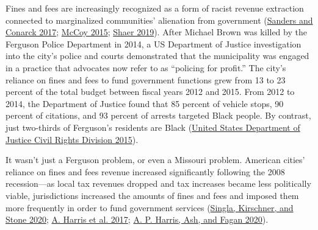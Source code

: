 \documentclass[
  12pt,
]{article}
\begin{document}
Fines and fees are increasingly recognized as a form of racist revenue extraction connected to marginalized communities' alienation from government (\protect\hyperlink{ref-Sanders2017}{Sanders and Conarck 2017}; \protect\hyperlink{ref-McCoy2015}{McCoy 2015}; \protect\hyperlink{ref-Shaer2019}{Shaer 2019}). After Michael Brown was killed by the Ferguson Police Department in 2014, a US Department of Justice investigation into the city's police and courts demonstrated that the municipality was engaged in a practice that advocates now refer to as ``policing for profit.'' The city's reliance on fines and fees to fund government functions grew from 13 to 23 percent of the total budget between fiscal years 2012 and 2015. From 2012 to 2014, the Department of Justice found that 85 percent of vehicle stops, 90 percent of citations, and 93 percent of arrests targeted Black people. By contrast, just two-thirds of Ferguson's residents are Black (\protect\hyperlink{ref-UnitedStatesDepartmentofJusticeCivilRightsDivision2015}{United States Department of Justice Civil Rights Division 2015}).

It wasn't just a Ferguson problem, or even a Missouri problem. American cities' reliance on fines and fees revenue increased significantly following the 2008 recession---as local tax revenues dropped and tax increases became less politically viable, jurisdictions increased the amounts of fines and fees and imposed them more frequently in order to fund government services (\protect\hyperlink{ref-Singla2020}{Singla, Kirschner, and Stone 2020}; \protect\hyperlink{ref-Harris2017}{A. Harris et al. 2017}; \protect\hyperlink{ref-Harris2020}{A. P. Harris, Ash, and Fagan 2020}).
\end{document}

